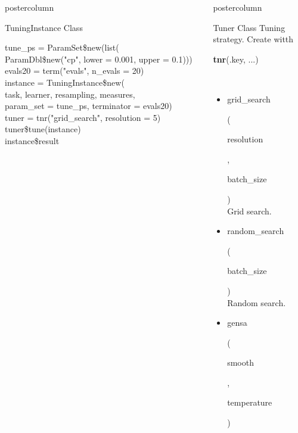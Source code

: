 \documentclass{beamer}
\newlength{\columnheight} %
\newcommand{\codeinline}[1]{\begin{codeboxinline}#1\end{codeboxinline}}
\begin{document}
\begin{frame}[fragile]{}
\begin{columns}
\begin{column}{.245\textwidth}
\begin{beamercolorbox}[center]{postercolumn}
\begin{minipage}{.98\textwidth}
{\begin{myblock}{TuningInstance Class}
\begin{codeboxexample}
							\footnotesize{
								tune\_ps = ParamSet\$new(list(\\
								\hspace*{1ex} ParamDbl\$new("cp", lower = 0.001, upper = 0.1)))
								evals20 = term("evals", n\_evals = 20)
								\vspace{1em}
								\\
								instance = TuningInstance\$new(\\
								\hspace*{1ex} task, learner, resampling, measures,\\
								\hspace*{1ex} param\_set = tune\_ps, terminator = evals20)\\
								tuner = tnr("grid\_search", resolution = 5)
								\vspace{1em}
								\\
								tuner\$tune(instance)\\
								instance\$result
							}
						\end{codeboxexample}
						\end{myblock}
						\vfill}
				\end{minipage}
			\end{beamercolorbox}
		\end{column}
		\begin{column}{.245\textwidth}
			\begin{beamercolorbox}[center]{postercolumn}
				\begin{minipage}{.98\textwidth}
					\parbox[t][\columnheight]{\textwidth}{
						\begin{myblock}{Tuner Class}
                            Tuning strategy. Create witth \codeinline{\textbf{tnr}(.key, ...)}
							\\
							\begin{itemize}
								\item \codeinline{grid\_search}
								(\codeinline{resolution}, \codeinline{batch\_size})\\
								Grid search.
								\item \codeinline{random\_search}
								(\codeinline{batch\_size})\\
								Random search.
								\item \codeinline{gensa}
								(\codeinline{smooth}, \codeinline{temperature})\\

\end{itemize}
\end{myblock}}
\end{minipage}
\end{beamercolorbox}
\end{column}
\end{columns}
\end{frame}
\end{document}
